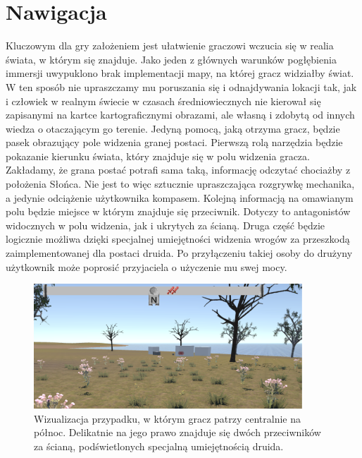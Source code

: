 \chapter{Nawigacja}\label{chap:naw}

    Kluczowym dla gry założeniem jest ułatwienie graczowi wczucia się w realia świata, w którym się znajduje. Jako jeden z głównych warunków pogłębienia immersji uwypuklono brak implementacji mapy, na której gracz widziałby świat. W ten sposób nie upraszczamy mu poruszania się i odnajdywania lokacji tak, jak i człowiek w realnym świecie w czasach średniowiecznych nie kierował się zapisanymi na kartce kartograficznymi obrazami, ale własną i zdobytą od innych wiedza o otaczającym go terenie. 
    Jedyną pomocą, jaką otrzyma gracz, będzie pasek obrazujący pole widzenia granej postaci. Pierwszą rolą narzędzia będzie pokazanie kierunku świata, który znajduje się w polu widzenia gracza. Zakładamy, że grana postać potrafi sama taką, informację odczytać chociażby z położenia Słońca. Nie jest to więc sztucznie upraszczająca rozgrywkę mechanika, a jedynie odciążenie użytkownika kompasem. 
    Kolejną informacją na omawianym polu będzie miejsce w którym znajduje się przeciwnik. Dotyczy to antagonistów widocznych w polu widzenia, jak i ukrytych za ścianą. Druga część będzie logicznie możliwa dzięki specjalnej umiejętności widzenia wrogów za przeszkodą zaimplementowanej dla postaci druida. Po przyłączeniu takiej osoby do drużyny użytkownik może poprosić przyjaciela o użyczenie mu swej mocy.

\begin{figure}[htbp]
    \centering
    \includegraphics[width=0.9\textwidth]{images/ui/compass.png}
    \caption{Wizualizacja przypadku, w którym gracz patrzy centralnie na północ. Delikatnie na jego prawo znajduje się dwóch przeciwników za ścianą, podświetlonych specjalną umiejętnością druida.
    }\label{fig:compass}
\end{figure}

